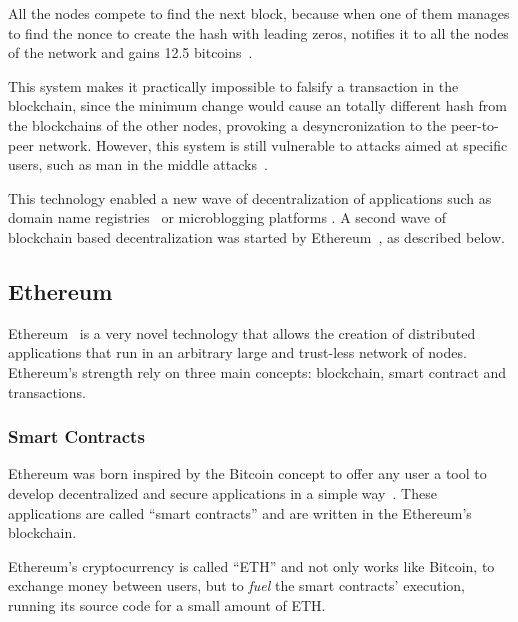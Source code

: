 
All the nodes compete to find the next block, because when one of them manages
to find the nonce to create the hash with leading zeros, notifies it to all the
nodes of the network and gains 12.5 bitcoins~\cite{barber2012bitter}.

This system makes it practically impossible to falsify a transaction in the
blockchain, since the minimum change would cause an totally different hash from
the blockchains of the other nodes, provoking a desyncronization to the
peer-to-peer network. However, this system is still vulnerable to attacks aimed
at specific users, such as man in the middle attacks~\cite{moore2013beware}.

This technology enabled a new wave of decentralization of applications such as
domain name registries~\cite{benshoof2016distributed} or microblogging platforms
\cite{freitas2013twister}. A second wave of blockchain based decentralization
was started by Ethereum~\cite{buterin2014ethereum}, as described below.

\subsection{Ethereum}
\label{tb:eth}
Ethereum~\cite{buterin2014ethereum} is a very novel technology that allows the
creation of distributed applications that run in an arbitrary large and
trust-less network of nodes. Ethereum's strength rely on three main concepts:
blockchain, smart contract and transactions.

\subsubsection*{Smart Contracts}
\label{tb:cryptos:sm}

Ethereum was born inspired by the Bitcoin concept to offer any user a tool to
develop decentralized and secure applications in a simple
way~\cite{buterin2014ethereum}. These applications are called ``smart
contracts'' and are written in the Ethereum's blockchain.

Ethereum's cryptocurrency is called ``ETH'' and not only works like Bitcoin, to
exchange money between users, but to \emph{fuel} the smart contracts' execution,
running its source code for a small amount of ETH.

